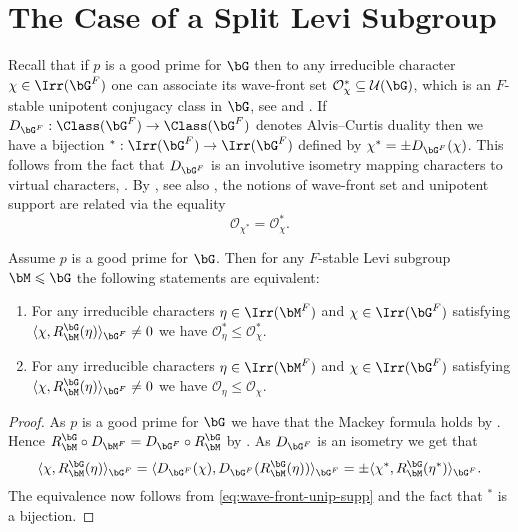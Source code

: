 \documentclass[eqthmnum,nocolour,skinny]{jt-calcs}
\begin{document}
\section{The Case of a Split Levi Subgroup}\label{sec:split-levi-case}
\begin{pa}
Recall that if $p$ is a good prime for $\bG$ then to any irreducible character $\chi \in \Irr(\bG^F)$ one can associate its wave-front set $\mathcal{O}_{\chi}^* \subseteq \mathcal{U}(\bG)$, which is an $F$-stable unipotent conjugacy class in $\bG$, see \cite[11.2]{lusztig:1992:a-unipotent-support} and \cite[14.10]{taylor:2016:GGGRs-small-characteristics}. If $D_{\bG^F} : \Class(\bG^F) \to \Class(\bG^F)$ denotes Alvis--Curtis duality then we have a bijection ${}^* : \Irr(\bG^F) \to \Irr(\bG^F)$ defined by $\chi^* = \pm D_{\bG^F}(\chi)$. This follows from the fact that $D_{\bG^F}$ is an involutive isometry mapping characters to virtual characters, \cite[\S8]{digne-michel:1991:representations-of-finite-groups-of-lie-type}. By \cite[11.2]{lusztig:1992:a-unipotent-support}, see also \cite[14.15]{taylor:2016:GGGRs-small-characteristics}, the notions of wave-front set and unipotent support are related via the equality
\begin{equation}\label{eq:wave-front-unip-supp}
\mathcal{O}_{\chi^*} = \mathcal{O}_{\chi}^*.
\end{equation}
\end{pa}

\begin{lem}\label{lem:equiv-dual-statements}
Assume $p$ is a good prime for $\bG$. Then for any $F$-stable Levi subgroup $\bM \leqslant \bG$ the following statements are equivalent:
\begin{enumerate}[label=\textnormal{(\roman*)}]
	\item For any irreducible characters $\eta \in \Irr(\bM^F)$ and $\chi \in \Irr(\bG^F)$ satisfying $\langle \chi, R_{\bM}^{\bG}(\eta)\rangle_{\bG^F} \neq 0$ we have ${\mathcal{O}_{\eta}^*} \leqslant \mathcal{O}_{\chi}^*$.
	\item For any irreducible characters $\eta \in \Irr(\bM^F)$ and $\chi \in \Irr(\bG^F)$ satisfying $\langle \chi, R_{\bM}^{\bG}(\eta)\rangle_{\bG^F} \neq 0$ we have $\mathcal{O}_{\eta} \leqslant \mathcal{O}_{\chi}$.
\end{enumerate}
\end{lem}

\begin{proof}
As $p$ is a good prime for $\bG$ we have that the Mackey formula holds by \cite{bonnafe-michel:2011:mackey-formula}. Hence $R_{\bM}^{\bG} \circ D_{\bM^F} = D_{\bG^F} \circ R_{\bM}^{\bG}$ by \cite[10.13]{bonnafe:2006:sln}. As $D_{\bG^F}$ is an isometry we get that
\begin{equation*}
\langle \chi,R_{\bM}^{\bG}(\eta)\rangle_{\bG^F} = \langle D_{\bG^F}(\chi),D_{\bG^F}(R_{\bM}^{\bG}(\eta))\rangle_{\bG^F} = \pm \langle \chi^*,R_{\bM}^{\bG}(\eta^*)\rangle_{\bG^F}.
\end{equation*}
The equivalence now follows from \cref{eq:wave-front-unip-supp} and the fact that ${}^*$ is a bijection.
\end{proof}
\end{document}
